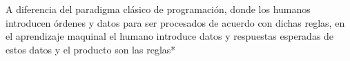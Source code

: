 A diferencia del paradigma clásico de programación, donde los humanos introducen órdenes y datos para ser procesados de acuerdo con dichas reglas, en el aprendizaje maquinal el humano introduce datos y respuestas esperadas de estos datos y el producto son las reglas* 